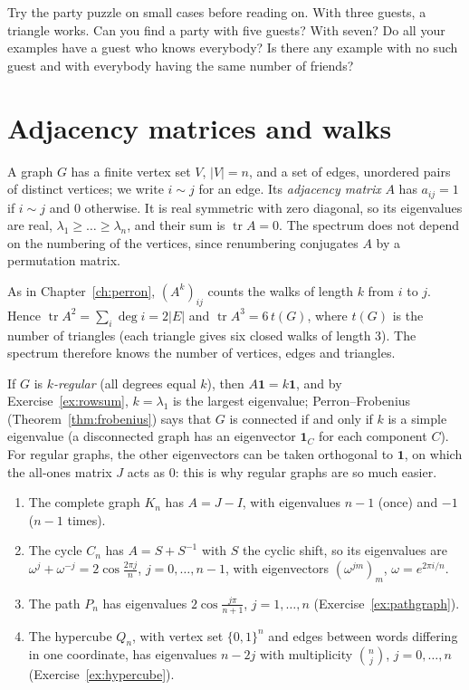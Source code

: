 \begin{think}
Try the party puzzle on small cases before reading on. With three guests, a triangle works. Can you find a party with five
guests? With seven? Do all your examples have a guest who knows everybody? Is there any example with no such guest and with
everybody having the same number of friends?
\end{think}

\section{Adjacency matrices and walks}

A graph $G$ has a finite vertex set $V$, $|V|=n$, and a set of edges, unordered pairs of distinct vertices; we write $i\sim j$ for
an edge. Its \emph{adjacency matrix} $A$ has $a_{ij}=1$ if $i\sim j$ and $0$ otherwise. It is real symmetric with zero diagonal,
so its eigenvalues are real, $\lambda_1\ge\dots\ge\lambda_n$, and their sum is $\operatorname{tr}A=0$. The spectrum does not
depend on the numbering of the vertices, since renumbering conjugates $A$ by a permutation matrix.

As in Chapter~\ref{ch:perron}, $(A^k)_{ij}$ counts the walks of length $k$ from $i$ to $j$. Hence $\operatorname{tr}A^2=\sum_i\deg i
=2|E|$ and $\operatorname{tr}A^3=6\,t(G)$, where $t(G)$ is the number of triangles (each triangle gives six closed walks of length
$3$). The spectrum therefore knows the number of vertices, edges and triangles.

If $G$ is \emph{$k$-regular} (all degrees equal $k$), then $A\mathbf 1=k\mathbf 1$, and by Exercise~\ref{ex:rowsum}, $k=\lambda_1$
is the largest eigenvalue; Perron--Frobenius (Theorem~\ref{thm:frobenius}) says that $G$ is connected if and only if $k$ is a
simple eigenvalue (a disconnected graph has an eigenvector $\mathbf 1_C$ for each component $C$). For regular graphs, the other
eigenvectors can be taken orthogonal to $\mathbf 1$, on which the all-ones matrix $J$ acts as $0$: this is why regular graphs are
so much easier.

\begin{example}\label{exa:spectra}
\begin{enumerate}[label=(\alph*)]
\item The complete graph $K_n$ has $A=J-I$, with eigenvalues $n-1$ (once) and $-1$ ($n-1$ times).
\item The cycle $C_n$ has $A=S+S^{-1}$ with $S$ the cyclic shift, so its eigenvalues are $\omega^j+\omega^{-j}=2\cos\frac{2\pi j}n$,
$j=0,\dots,n-1$, with eigenvectors $(\omega^{jm})_m$, $\omega=e^{2\pi i/n}$.
\item The path $P_n$ has eigenvalues $2\cos\frac{j\pi}{n+1}$, $j=1,\dots,n$ (Exercise~\ref{ex:pathgraph}).
\item The hypercube $Q_n$, with vertex set $\{0,1\}^n$ and edges between words differing in one coordinate, has eigenvalues
$n-2j$ with multiplicity $\binom nj$, $j=0,\dots,n$ (Exercise~\ref{ex:hypercube}).
\end{enumerate}
\end{example}

